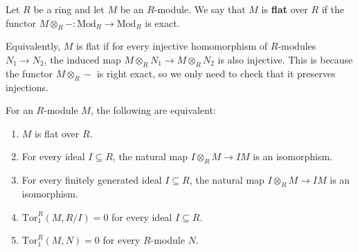 \documentclass[12pt]{article}
\begin{document}
\begin{definition}
    Let $R$ be a ring and let $M$ be an $R$-module. We say that $M$ is \textbf{flat} over $R$ if the functor $M \otimes_R -: \text{Mod}_R \to \text{Mod}_R$ is exact.

    Equivalently, $M$ is flat if for every injective homomorphism of $R$-modules $N_1 \to N_2$, the induced map $M \otimes_R N_1 \to M \otimes_R N_2$ is also injective. This is because the functor $M \otimes_R -$ is right exact, so we only need to check that it preserves injections.
\end{definition}
\begin{proposition}
    For an $R$-module $M$, the following are equivalent:
    \begin{enumerate}
        \item $M$ is flat over $R$.
        \item For every ideal $I \subseteq R$, the natural map $I \otimes_R M \to IM$ is an isomorphism.
        \item For every finitely generated ideal $I \subseteq R$, the natural map $I \otimes_R M \to IM$ is an isomorphism.
        \item $\text{Tor}_1^R(M, R/I) = 0$ for every ideal $I \subseteq R$.
        \item $\text{Tor}_1^R(M, N) = 0$ for every $R$-module $N$.
    \end{enumerate}
\end{proposition}
\end{document}

